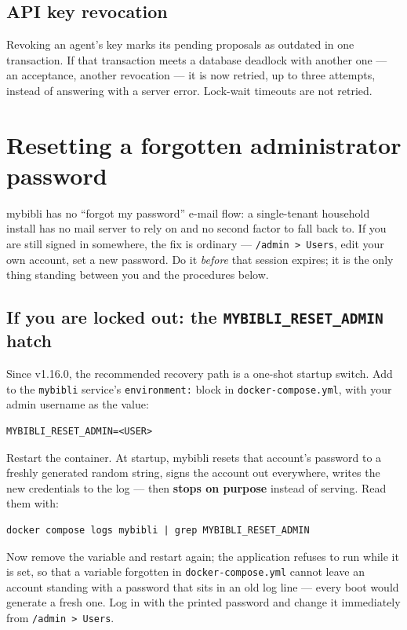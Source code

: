 \subsection*{API key revocation}

Revoking an agent's key marks its pending proposals as outdated in one
transaction. If that transaction meets a database deadlock with
another one --- an acceptance, another revocation --- it is now
retried, up to three attempts, instead of answering with a server
error. Lock-wait timeouts are not retried.

\section{Resetting a forgotten administrator password}\label{sec:reset-admin-password}

mybibli has no ``forgot my password'' e-mail flow: a single-tenant
household install has no mail server to rely on and no second factor to
fall back to. If you are still signed in somewhere, the fix is ordinary
— \texttt{/admin > Users}, edit your own account, set a new password.
Do it \emph{before} that session expires; it is the only thing standing
between you and the procedures below.

\subsection*{If you are locked out: the \texttt{MYBIBLI\_RESET\_ADMIN} hatch}

Since v1.16.0, the recommended recovery path is a one-shot startup
switch. Add to the \texttt{mybibli} service's \texttt{environment:}
block in \texttt{docker-compose.yml}, with your admin username as the
value:

\begin{lstlisting}
MYBIBLI_RESET_ADMIN=<USER>
\end{lstlisting}

Restart the container. At startup, mybibli resets that account's
password to a freshly generated random string, signs the account out
everywhere, writes the new credentials to the log — then \textbf{stops
on purpose} instead of serving. Read them with:

\begin{lstlisting}
docker compose logs mybibli | grep MYBIBLI_RESET_ADMIN
\end{lstlisting}

Now remove the variable and restart again; the application refuses to
run while it is set, so that a variable forgotten in
\texttt{docker-compose.yml} cannot leave an account standing with a
password that sits in an old log line — every boot would generate a
fresh one. Log in with the printed password and change it immediately
from \texttt{/admin > Users}.

